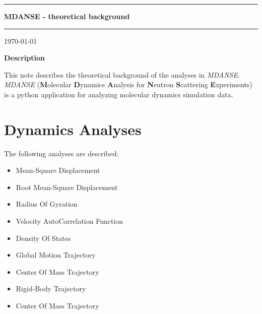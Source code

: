 \documentclass[a4paper,11pt]{article}
\begin{document}
\begin{titlepage}

\begin{center}

\vspace{2cm}
 
\hrule height 0.1cm
\vspace{0.5cm}
{\Huge \bfseries MDANSE - theoretical background}\\
\vspace{0.5cm}
\hrule height 0.1cm

\vspace{1.0cm}
 
{\large \today}\\

\vspace{1.0cm}

{\large \textbf{Description}}\\

\end{center}

\noindent This note describes the theoretical background of the analyses in \textit{MDANSE}. \textit{MDANSE} (\textbf{M}olecular \textbf{D}ynamics \textbf{A}nalysis 
for \textbf{N}eutron \textbf{S}cattering \textbf{E}xperiments) is a python application for analyzing molecular dynamics simulation data.


\end{titlepage}

\tableofcontents{}

\newpage

\section{Dynamics Analyses}
\label{dynamics_menu}
The following analyses are described:
\begin{itemize}
\item Mean-Square Displacement
\item Root Mean-Square Displacement
\item Radius Of Gyration
\item Velocity AutoCorrelation Function
\item Density Of States
\item Global Motion Trajectory
\item Center Of Mass Trajectory
\item Rigid-Body Trajectory
\item Center Of Mass Trajectory
\end{itemize}
\end{document}
